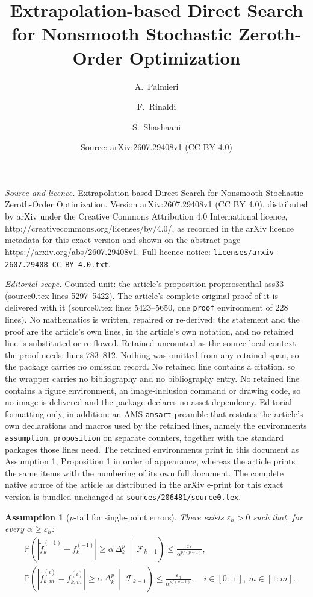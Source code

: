 \documentclass[10pt,a4paper]{amsart}
\title{Extrapolation-based Direct Search for Nonsmooth Stochastic Zeroth-Order Optimization}
\author{A.~Palmieri \and F.~Rinaldi \and S.~Shashaani}
\date{Source: arXiv:2607.29408v1 (CC BY 4.0)}
\newtheorem{assumption}{Assumption}
\newcommand{\Dexp}{p}
\newcommand{\F}{\mathcal{F}}
\newcommand{\Imax}{\bar{\imath}}%
\newcommand{\aexp}{\Dexp/(\Dexp-1)}
\begin{document}
\maketitle

\noindent\emph{Source and licence.} Extrapolation-based Direct Search for Nonsmooth Stochastic Zeroth-Order Optimization. Version arXiv:2607.29408v1 (CC BY 4.0), distributed by arXiv under the Creative Commons Attribution 4.0 International licence, http://creativecommons.org/licenses/by/4.0/, as recorded in the arXiv licence metadata for this exact version and shown on the abstract page https://arxiv.org/abs/2607.29408v1. Full licence notice: \texttt{licenses/arxiv-2607.29408-CC-BY-4.0.txt}.\par\smallskip

\noindent\textit{Editorial scope.} Counted unit: the article's proposition prop:rosenthal-ass33 (source0.tex lines 5297--5422). The article's complete original proof of it is delivered with it (source0.tex lines 5423--5650, one \texttt{proof} environment of 228 lines). No mathematics is written, repaired or re-derived: the statement and the proof are the article's own lines, in the article's own notation, and no retained line is substituted or re-flowed.  Retained uncounted as the source-local context the proof needs: lines 783--812.  Nothing was omitted from any retained span, so the package carries no omission record.  No retained line contains a citation, so the wrapper carries no bibliography and no bibliography entry.  No retained line contains a figure environment, an image-inclusion command or drawing code, so no image is delivered and the package declares no asset dependency.  Editorial formatting only, in addition: an AMS \texttt{amsart} preamble that restates the article's own declarations and macros used by the retained lines, namely the environments \texttt{assumption}, \texttt{proposition} on separate counters, together with the standard packages those lines need.  The retained environments print in this document as Assumption 1, Proposition 1 in order of appearance, whereas the article prints the same items with the numbering of its own full document.  The complete native source of the article as distributed in the arXiv e-print for this exact version is bundled unchanged as \texttt{sources/206481/source0.tex}.
\begin{assumption}[$\Dexp$-tail for single-point errors]\label{ass:quadratic tail}
There exists $\varepsilon_h>0$ such that, for every $\alpha\ge \varepsilon_h$:
\begin{equation}\label{eq:A4}
\begin{aligned}
&\mathbb P\!\left(
|\tilde f_{k}^{(-1)}-f_{k}^{(-1)}|
\ge
\alpha\,\Delta_k^{\Dexp}
\ \middle|\ 
\F_{k-1}
\right)
\le
\frac{\varepsilon_h}{\alpha^{\aexp}},
\\[1mm]
&\mathbb P\!\left(
|\tilde f_{k,m}^{(i)}-f_{k,m}^{(i)}|
\ge
\alpha\,\Delta_k^{\Dexp}
\ \middle|\ 
\F_{k-1}
\right)
\le
\frac{\varepsilon_h}{\alpha^{\aexp}},
\quad
i\in[0:\Imax],\ m\in[1:\bar{m}].
\end{aligned}
\end{equation}


\end{assumption}
\end{document}
